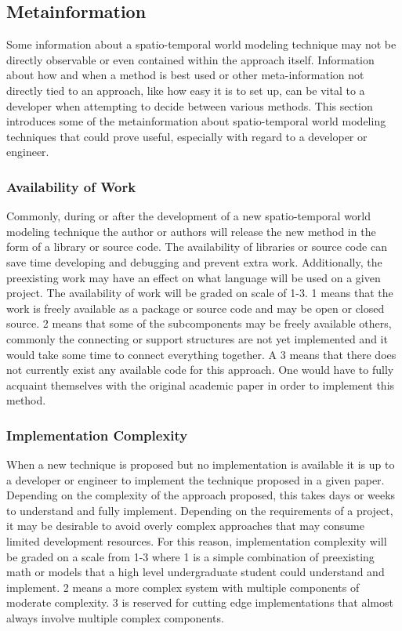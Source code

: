   \subsection{ Metainformation }

  Some information about a spatio-temporal world modeling technique may not be
  directly observable or even contained within the approach itself. Information
  about how and when a method is best used or other meta-information not directly
  tied to an approach, like how easy it is to set up, can be vital to a developer
  when attempting to decide between various methods. This section introduces
  some of the metainformation about spatio-temporal world modeling techniques
  that could prove useful, especially with regard to a developer or engineer.

  \subsubsection{ Availability of Work }
  Commonly, during or after the development of a new spatio-temporal world
  modeling technique the author or authors will release the new method in the
  form of a library or source code. The availability of libraries or source code
  can save time developing
  and debugging and prevent extra work. Additionally, the preexisting work may have an effect
  on what language will be used on a given project. The availability of work
  will be graded on scale of 1-3. 1 means that the work is
  freely available as a package or source code and may be open or closed source.
  2 means that some of the subcomponents may be freely available others,
  commonly the connecting or support structures are not yet implemented and it
  would take some time to connect everything together. A 3 means that there
  does not currently exist any available code for this approach. One would have
  to fully acquaint themselves with the original academic paper in order to
  implement this method.

  \subsubsection{ Implementation Complexity }
  When a new technique is proposed but no implementation is available it is
  up to a developer or engineer to implement the technique proposed in a given paper.
  Depending on the complexity of the approach proposed, this takes days or
  weeks to understand and fully implement. Depending
  on the requirements of a project, it may be desirable to avoid overly complex
  approaches that may consume limited development resources. For this reason,
  implementation complexity will be graded on a scale from 1-3 where 1 is a
  simple combination of preexisting math or models that a high
  level undergraduate student could understand and implement. 2 means a
  more complex system with multiple components of moderate complexity.
  3 is reserved for cutting edge implementations that almost always involve
  multiple complex components.

